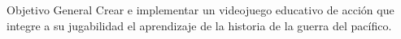 \begin{section}{Objetivo General}
  Crear e implementar un videojuego educativo de acción que integre a su jugabilidad el aprendizaje de la historia de la guerra del pacífico.
\end{section}

